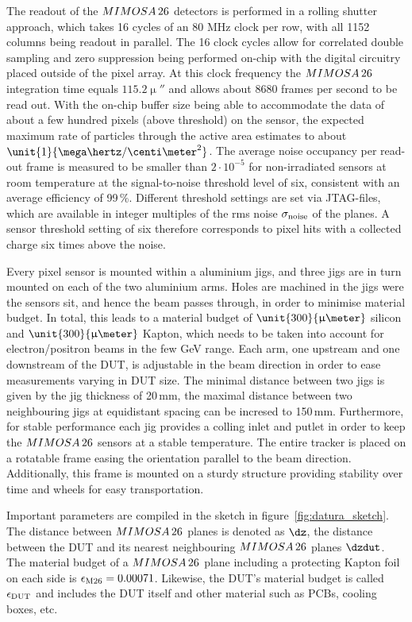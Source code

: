 The readout of the $MIMOSA\,26$ detectors is performed in a rolling shutter approach, which takes 16 cycles of an 80 MHz clock per row, with all 1152 columns being readout in parallel. 
The 16 clock cycles allow for correlated double sampling and zero suppression being performed on-chip with the digital circuitry placed outside of the pixel array.
At this clock frequency the $MIMOSA\,26$ integration time equals $\unit{115.2}{\upmu\second}$ and allows about 8680 frames per second to be read out. 
With the on-chip buffer size being able to accommodate the data of about a few hundred pixels (above threshold) on the sensor,
the expected maximum rate of particles through the active area estimates to about $\unit{1}{\mega\hertz/\centi\meter^2}$. 
The average noise occupancy per read-out frame is measured to be smaller than $2\cdot10^{-5}$ for non-irradiated sensors at room temperature at the signal-to-noise threshold level of six,
 consistent with an average efficiency of 99\,\%. 
Different threshold settings are set via JTAG-files, which are available in integer multiples of the rms noise $\sigma_{\textrm{noise}}$ of the planes. 
A sensor threshold setting of six therefore corresponds to pixel hits with a collected charge six times above the noise. 

Every pixel sensor is mounted within a aluminium jigs, and three jigs are in turn mounted on each of the two aluminium arms. 
Holes are machined in the jigs were the sensors sit, and hence the beam passes through, in order to minimise material budget. 
In total, this leads to a material budget of $\unit{300}{\upmu\meter}$ silicon and $\unit{300}{\upmu\meter}$ Kapton, which needs to be taken into account for electron/positron beams in the few GeV range. 
Each arm, one upstream and one downstream of the DUT, is adjustable in the beam direction in order to ease measurements varying in DUT size.
The minimal distance between two jigs is given by the jig thickness of 20\,mm, the maximal distance between two neighbouring jigs at equidistant spacing can be incresed to 150\,mm.
Furthermore, for stable performance each jig provides a colling inlet and putlet in order to keep the $MIMOSA\,26$ sensors at a stable temperature. 
The entire tracker is placed on a rotatable frame easing the orientation parallel to the beam direction. 
Additionally, this frame is mounted on a sturdy structure providing stability over time and wheels for easy transportation. 

Important parameters are compiled in the sketch in figure~\ref{fig:datura_sketch}. 
The distance between $MIMOSA\,26$ planes is denoted as $\dz$, the distance between the DUT and its nearest neighbouring $MIMOSA\,26$ planes $\dzdut$. 
The material budget of a $MIMOSA\,26$ plane including a protecting Kapton foil on each side is $\mathnormal{\epsilon_{\textrm{M26}}} = 0.00071$. 
Likewise, the DUT's material budget is called $\mathnormal{\epsilon_{\textrm{DUT}}}$ and includes the DUT itself and other material such as PCBs, cooling boxes, etc.


